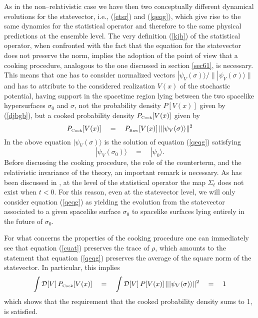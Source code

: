 \documentclass[12pt]{article}
\begin{document}
As in the non--relativistic case we have then two conceptually
different dynamical evolutions for the statevector, i.e.,
(\ref{etsr}) and (\ref{qeqg}), which give rise to the same
dynamics for the statistical operator and therefore to the same
physical predictions at the ensemble level. The very definition
(\ref{kjh}) of the statistical operator, when confronted with the
fact that the equation for the statevector does not preserve the
norm, implies the adoption of the point of view that a cooking
procedure, analogous to the one discussed in section \ref{sec61},
is necessary. This means that one has to consider normalized
vectors $|\psi_{V}(\sigma)\rangle/\| |\psi_{V}(\sigma)\rangle\|$
and has to attribute to the considered realization $V(x)$ of the
stochastic potential, having support in the spacetime region lying
between the two spacelike hypersurfaces $\sigma_{0}$ and $\sigma$,
not the probability density $P[V(x)]$ given by (\ref{djbgb}), but
a cooked probability density $P_{\makebox{\tiny Cook}}[V(x)]$
given by
\begin{equation}
P_{\makebox{\tiny Cook}}[V(x)] \quad = \quad P_{\makebox{\tiny
Raw}}[V(x)]\, \|  |\psi_{V}(\sigma)\rangle\|^{2}
\end{equation}
In the above equation $|\psi_{V}(\sigma)\rangle$ is the solution
of equation  (\ref{qeqg}) satisfying
\begin{equation}
|\psi_{V}(\sigma_{0})\rangle \quad = \quad |\psi_{0}\rangle.
\end{equation}
Before discussing the cooking procedure, the role of the
counterterm, and the relativistic invariance of the theory, an
important remark is necessary. As  has been discussed in
\cite{rel}, at the level of the statistical operator the map
$\Sigma_{t}$ does not exist when $t < 0$. For this reason, even at
the statevector level, we will only consider equation (\ref{qeqg})
as yielding the evolution from the statevector associated to a
given spacelike surface $\sigma_{0}$ to spacelike surfaces lying
entirely in the future of $\sigma_{0}$.

For what concerns the properties of the cooking procedure one can
immediately see that equation (\ref{cuat}) preserves the trace of
$\rho$,  which amounts to the statement that equation (\ref{qeqg})
preserves the average of the square norm of the statevector. In
particular, this implies
\begin{equation}
\int {\mathcal D}[V]\, P_{\makebox{\tiny Cook}}[V(x)] \quad =
\quad \int {\mathcal D}[V]\, P[V(x)] \, \|
|\psi_{V}(\sigma)\rangle \|^{2} \quad = \quad 1
\end{equation}
which shows that the requirement that the cooked probability
density sums to 1, is satisfied.
\end{document}
